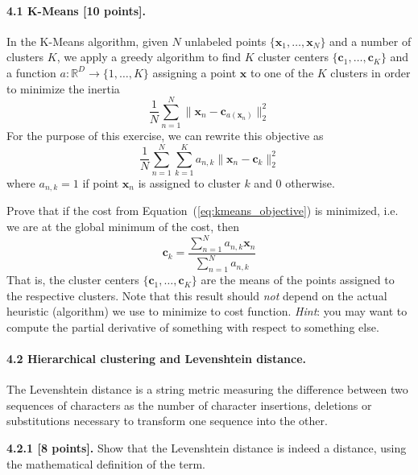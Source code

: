 \documentclass{article}
\begin{document}
\paragraph{4.1 K-Means [10 points].} In the K-Means algorithm, given $N$ unlabeled points $\{\mathbf{x}_1, \dots, \mathbf{x}_N\}$ and a number of clusters $K$, we apply a greedy algorithm to find $K$ cluster centers $\{\mathbf{c}_1, \dots, \mathbf{c}_K\}$ and a function $a: \mathbb{R}^D \rightarrow \{1, \dots, K\}$ assigning a point $\mathbf{x}$ to one of the $K$ clusters
in order to minimize the inertia
\begin{equation}
\frac{1}{N} \sum_{n=1}^N \lVert \mathbf{x}_n - \mathbf{c}_{a(\mathbf{x}_n)}\rVert_2^2
\end{equation}
For the purpose of this exercise, we can rewrite this objective as
\begin{equation} \label{eq:kmeans_objective}
\frac{1}{N} \sum_{n=1}^N \sum_{k=1}^K a_{n,k} \lVert \mathbf{x}_n - \mathbf{c}_{k}\rVert_2^2
\end{equation}
where $a_{n,k}=1$ if point $\mathbf{x}_n$ is assigned to cluster $k$ and $0$ otherwise.

\noindent Prove that if the cost from Equation~(\ref{eq:kmeans_objective}) is minimized, i.e. we are at the global minimum of the cost, then
\begin{equation}
\mathbf{c}_k = \frac{\sum_{n=1}^N a_{n,k} \mathbf{x}_n}
{\sum_{n=1}^N a_{n,k}}
\end{equation}
That is, the cluster centers $\{\mathbf{c}_1, \dots, \mathbf{c}_K\}$ are the means of the points assigned to the respective clusters.
Note that this result should \textit{not} depend on the actual heuristic (algorithm) we use to minimize to cost function.
\textit{Hint}: you may want to compute the partial derivative of something with respect to something else.

\paragraph{4.2 Hierarchical clustering and Levenshtein distance.} The Levenshtein distance is a string metric measuring the difference between two sequences of characters as the number of character insertions, deletions or substitutions necessary to transform one sequence into the other.

\noindent\textbf{4.2.1 [8 points].} Show that the Levenshtein distance is indeed a distance, using the mathematical definition of the term.
\end{document}
